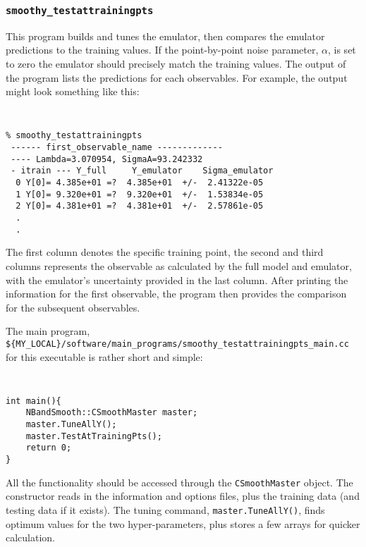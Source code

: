 \documentclass[UserManual.tex]{subfiles}
\begin{document}
\subsubsection{{\tt smoothy\_testattrainingpts}}
This program builds and tunes the emulator, then compares the emulator predictions to the training values. If the point-by-point noise parameter, $\alpha$, is set to zero the emulator should precisely match the training values. The output of the program lists the predictions for each observables. For example, the output might look something like this:
{\tt
\begin{verbatim}
% smoothy_testattrainingpts
 ------ first_observable_name -------------
 ---- Lambda=3.070954, SigmaA=93.242332
 - itrain --- Y_full     Y_emulator    Sigma_emulator
  0 Y[0]= 4.385e+01 =?  4.385e+01  +/-  2.41322e-05
  1 Y[0]= 9.320e+01 =?  9.320e+01  +/-  1.53834e-05
  2 Y[0]= 4.381e+01 =?  4.381e+01  +/-  2.57861e-05
  .
  .
\end{verbatim}}
The first column denotes the specific training point, the second and third columns represents the observable as calculated by the full model and emulator, with the emulator's uncertainty provided in the last column. After printing the information for the first observable, the program then provides the comparison for the subsequent observables.

The main program, {\tt \$\{MY\_LOCAL\}/software/main\_programs/smoothy\_testattrainingpts\_main.cc} for this executable is rather short and simple:
{\tt
\begin{verbatim}
int main(){
	NBandSmooth::CSmoothMaster master;
	master.TuneAllY();
	master.TestAtTrainingPts();
	return 0;
}
\end{verbatim}}
All the functionality should be accessed through the {\tt CSmoothMaster} object. The constructor reads in the information and options files, plus the training data (and testing data if it exists). The tuning command, {\tt master.TuneAllY()}, finds optimum values for the two hyper-parameters, plus stores a few arrays for quicker calculation.
\end{document}
